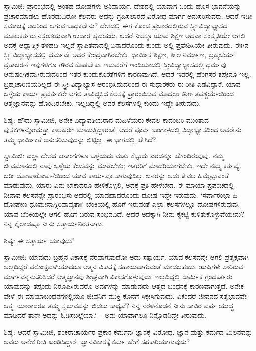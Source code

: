ಸ್ವಾಮಿಜಿ: ಪ್ರಾರಂಭದಲ್ಲಿ ಅಂತಹ ದೋಷಗಳು ಅನಿವಾರ್ಯ. ದೇಶದಲ್ಲಿ ಯಾವಾಗ ಒಂದು ಹೊಸ ಭಾವನೆಯನ್ನು ಪ್ರಚಾರಮಾಡಲು ಹೊರಡುವಿರೋ ಕೆಲವರು ಅದನ್ನು ಗ್ರಹಿಸಲಾರದೆ ವಿರೋಧ ಮಾರ್ಗ ಅನುಸರಿಸುವರು. ಆದರೆ ಇಡೀ ಸಮಾಜಕ್ಕೆ ಅದರಿಂದ ಆಗುವ ಬಾಧಕವೇನು? ದೇಶದಲ್ಲಿ ಈಗ ಕೊಂಚ ಪ್ರಚಾರದಲ್ಲಿರುವ ಸ್ತ್ರೀ ವಿದ್ಯಾಭ್ಯಾಸದ ಮೂಲಕರ್ತರು ನಿಸ್ಸಂಶಯವಾಗಿ ಉದಾರ ಹೃದಯರು. ಆದರೆ ನಿಜಕ್ಕೂ ಯಾವ ಶಿಕ್ಷಣ ಅಥವಾ ಸಂಸ್ಕೃತಿಯೇ ಆಗಲಿ ಅದಕ್ಕೆ ಆಧ್ಯಾತ್ಮಿಕ ತಳಹದಿ ಇಲ್ಲದೆ ಸ್ಥಾಪಿತವಾದಲ್ಲಿ ಏನಾದರೊಂದು ಕುಂದು ಅಲ್ಲಿ ಪ್ರವೇಶಿಸಿಯೇ ತೀರುವುದು. ಈಗಿನ ಸ್ತ್ರೀ ವಿದ್ಯಾಭ್ಯಾಸದಲ್ಲಿ ಧರ್ಮವೇ ಅದರ ಕೇಂದ್ರವಾಗಿರಬೇಕು. ಧಾರ್ಮಿಕ ಶಿಕ್ಷಣ, ಶೀಲ ನಿರ್ಮಾಣ, ಬ್ರಹ್ಮಚರ್ಯ ವ್ರತಾಚರಣೆ ಇವುಗಳಿಗೂ ಗೌರವ ಕೊಡಬೇಕು. ಇದುವರೆಗೆ ಇಂಡಿಯಾದಲ್ಲಿ ಸ್ತ್ರೀವಿದ್ಯಾಭ್ಯಾಸದಲ್ಲಿ ಧರ್ಮವು ಆನುಷಂಗಿಕವಾಗಿರುವುದರಿಂದ ಇತರ ಕುಂದುಕೊರತೆಗಳಿಗೆ ಕಾರಣವಾಗಿದೆ. ಆದರೆ ಇದರಲ್ಲಿ ಹೆಂಗಸರ ತಪ್ಪೇನೂ ಇಲ್ಲ. ಬ್ರಹ್ಮಚಾರಿಣಿಯರಿಲ್ಲದೆ ಈ ಸ್ತ್ರೀ ವಿದ್ಯಾಭ್ಯಾಸ ಆರಂಭಿಸಿದುದರಿಂದ ಈ ಸುಧಾರಕರು ಈ ರೀತಿ ಎಡವಿದ್ದಾರೆ. ಯಾವ ಒಳ್ಳೆಯ ಕಾರ್ಯ ಪ್ರವರ್ತಕರೇ ಆಗಲಿ ತಾವಿಚ್ಛಿಸಿದ ಕೆಲಸಕ್ಕೆ ಪ್ರಾರಂಭಿಸುವ ಮೊದಲು ಕಠಿಣ ತಪಶ್ಚರ್ಯೆಯಿಂದ ಆತ್ಮಜ್ಞಾನವನ್ನು ಹೊಂದಿರಬೇಕು. ಇಲ್ಲದಿದ್ದಲ್ಲಿ ಅವರ ಕೆಲಸಗಳಲ್ಲಿ ಕುಂದು ಇದ್ದೇ ತೀರುವುದು.

ಶಿಷ್ಯ: ಹೌದು ಸ್ವಾಮೀಜಿ, ಅನೇಕ ವಿದ್ಯಾವತಿಯರಾದ ಮಹಿಳೆಯರು ಕೇವಲ ಕಾದಂಬರಿ ಮುಂತಾದ ಪುಸ್ತಕಗಳನ್ನೋದುತ್ತಾ ಕಾಲಹರಣ ಮಾಡುತ್ತಿದ್ದಾರಂತೆ. ಆದರೆ ಪೂರ್ವ ಬಂಗಾಳದಲ್ಲಿ ವಿದ್ಯಾಭ್ಯಾಸದಿಂದ ಅವರೇನು ತಮ್ಮ ಧಾರ್ಮಿಕತೆ ಅನುಸರಿಸುವುದನ್ನು ಬಿಟ್ಟಿಲ್ಲ. ಈ ಭಾಗದಲ್ಲಿ ಹೇಗಿದೆ?

ಸ್ವಾಮಿಜಿ: ಎಲ್ಲಾ ದೇಶದ ಜನಾಂಗಗಳೂ ಒಳ್ಳೆಯದು ಮತ್ತು ಕೆಟ್ಟುದು ಎರಡನ್ನೂ ಹೊಂದಿರುವುವು. ನಮ್ಮ ಜೀವಮಾನದಲ್ಲಿ ನಾವು ಒಳ್ಳೆಯ ಕೆಲಸವನ್ನು ಮಾಡಬೇಕು; ಇತರರಿಗೆ ಮಾದರಿಯಾಗಬೇಕು. ಇದೇ ನಮ್ಮ ಕರ್ತವ್ಯ. ಬರೀ ದೋಷಾರೋಪಣೆಯಿಂದ ಯಾವ ಕಾರ್ಯವೂ ಸಾಗುವುದಿಲ್ಲ. ಜನರನ್ನು ಅದು ಕೇವಲ ಹಿಮ್ಮೆಟ್ಟುವಂತೆ ಮಾಡುವುದು. ಯಾರು ಏನು ಬೇಕಾದರೂ ಹೇಳಿಕೊಳ್ಳಲಿ, ಅದಕ್ಕೆ ಪ್ರತಿ ಹೇಳಬೇಡ. ಈ ಮಾಯಾ ಪ್ರಪಂಚದಲ್ಲಿ ನೀನಾವ ಕೆಲಸವನ್ನೇ ಪ್ರಾರಂಭಿಸು ಅದರಲ್ಲಿ ಯಾವುದಾದರೊಂದು ದೋಷ ಇದ್ದೇ ಇರುವುದು. ‘ಸರ್ವಾರಂಭಾ ಹಿ ದೋಷೇಣ ಧೂಮೇನಾಗ್ನಿರಿವಾವೃತಾಃ’ ಬೆಂಕಿಯಲ್ಲಿ ಹೊಗೆ ಇರುವಂತೆ ಎಲ್ಲಾ ಕೆಲಸಗಳಲ್ಲೂ ದೋಷಗಳಿರುವುವು. ಯಾವ ಬೆಂಕಿಯಲ್ಲೇ ಆಗಲಿ ಹೊಗೆ ಬರುವ ಸಂಭವವಿದೆ. ಆದರೆ ಅದಕ್ಕಾಗಿ ನೀನು ಕೈಕಟ್ಟಿ ಕುಳಿತುಕೊಳ್ಳುವೆಯೇನು? ನಿನ್ನ ಕೈಲಾದಷ್ಟೂ ನೀನು ಸತ್ಕಾರ್ಯನಿರತನಾಗು.

ಶಿಷ್ಯ: ಈ ಸತ್ಕಾರ್ಯ ಯಾವುದು?

ಸ್ವಾಮೀಜಿ: ಯಾವುದು ಬ್ರಹ್ಮನ ವಿಕಾಸಕ್ಕೆ ನೆರವಾಗುವುದೋ ಅದು ಸತ್ಕಾರ್ಯ. ಯಾವ ಕೆಲಸವನ್ನೇ ಆಗಲಿ ಪ್ರತ್ಯಕ್ಷವಾಗಿ ಅಲ್ಲದಿದ್ದರೆ ಪರೋಕ್ಷವಾಗಿಯಾದರೂ ಆತ್ಮನ ವಿಕಾಸಕ್ಕೆ ಸಹಾಯವಾಗುವಂತೆ ಮಾಡಬಹುದು. ಋಷಿಗಳು ಸಾರಿರುವ ಮಾರ್ಗವನ್ನನುಸರಿಸಿದರೆ ಆತ್ಮಜ್ಞಾನವು ಶೀಘ್ರವಾಗಿ ವಿಕಾಸಗೊಳ್ಳುವುದು. ಇಲ್ಲದಿದ್ದಲ್ಲಿ ಧಾರ್ಮಿಕ ಗ್ರಂಥಕರ್ತರು ಯಾವುದನ್ನು ತಪ್ಪೆಂದು ನಿರೂಪಿಸಿರುವರೊ ಅವುಗಳನ್ನು ಮಾಡುವುದು ಆತ್ಮದ ಬಂಧನಕ್ಕೆ ಕಾರಣವಾಗುತ್ತದೆ. ಅನೇಕ ವೇಳೆ ಈ ಮಾಯಾಬಂಧನಗಳಲ್ಲಿಯೂ ಜೀವನಿಗೆ ಮುಕ್ತಿ ಕೊನೆಗೆ ಸಿಕ್ಕೇಸಿಗುವುದು. ಏಕೆಂದರೆ ಜೀವನದ ಸತ್ಯಭಾವವೇ ಆತ್ಮ. ಯಾರಾದರೂ ತಮ್ಮ ಸ್ವಭಾವವನ್ನು ಬಿಡಲು ಸಾಧ್ಯವೆ? ನಿನ್ನ ನೆರಳಿನೊಡನೆ ನೀನು ಸಾವಿರ ವರ್ಷ ಯುದ್ಧ ಮಾಡಿದರೆ ತಾನೇ ಅದನ್ನು ಓಡಿಸಬಲ್ಲೆಯಾ? – ಅದು ಯಾವಾಗಲೂ ನಿನ್ನೊಡನಿದ್ದೇ ತೀರುವುದು.

ಶಿಷ್ಯ: ಆದರೆ ಸ್ವಾಮೀಜಿ, ಶಂಕರಾಚಾರ್ಯರ ಪ್ರಕಾರ ಕರ್ಮವು ಜ್ಞಾನಕ್ಕೆ ವಿರೋಧ. ಜ್ಞಾನ ಮತ್ತು ಕರ್ಮದ ಮಿಲನವನ್ನು ಅವರು ಅನೇಕ ರೀತಿ ಖಂಡಿಸಿದ್ದಾರೆ. ಜ್ಞಾನವಿಕಾಸಕ್ಕೆ ಕರ್ಮ ಹೇಗೆ ಸಹಕಾರಿಯಾಗುವುದು?

